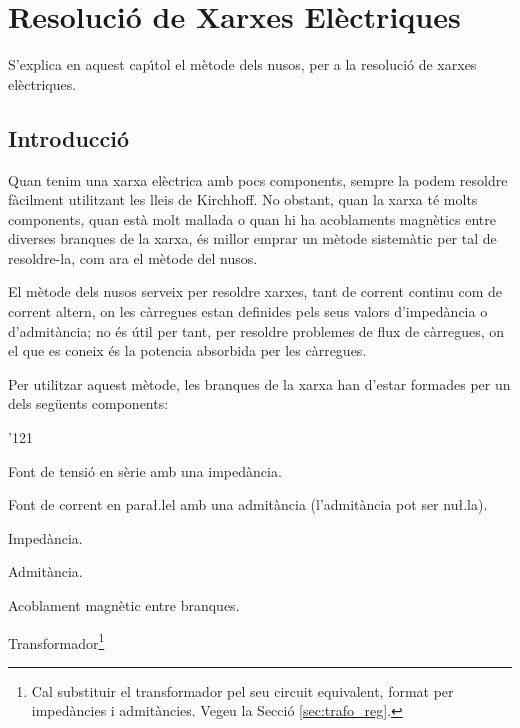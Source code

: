 \chapter{Resoluci\'{o} de Xarxes El\`{e}ctriques} \label{chap:nusos}

S'explica en aquest cap\'{\i}tol el
m\`{e}tode dels nusos, per a la resoluci\'{o} de xarxes el\`{e}ctriques.

\section{Introducci\'{o}}

Quan tenim una xarxa el\`{e}ctrica amb pocs components, sempre la podem resoldre f\`{a}cilment
utilitzant les lleis de Kirchhoff. No obstant, quan la xarxa t\'{e} molts components, quan est\`{a}
 molt mallada o quan hi ha acoblaments magn\`{e}tics entre diverses branques de la xarxa, \'{e}s millor
 emprar un m\`{e}tode sistem\`{a}tic per tal de resoldre-la, com ara el m\`{e}tode del nusos.

El m\`{e}tode dels nusos serveix per resoldre xarxes, tant de corrent
continu com de corrent altern, on les c\`{a}rregues estan definides pels
seus valors d'imped\`{a}ncia o d'admit\`{a}ncia; no \'{e}s \'{u}til per tant, per
resoldre problemes de flux de c\`{a}rregues, on el que es coneix \'{e}s la
potencia absorbida per les c\`{a}rregues.

Per utilitzar aquest m\`{e}tode, les branques de la xarxa han d'estar
formades per un dels seg\"{u}ents components: \vspace{-1.5mm}
\begin{dinglist}{'121}
   \item Font de tensi\'{o} en s\`{e}rie amb una imped\`{a}ncia.
   \item Font de corrent en para{\l.l}el amb una admit\`{a}ncia (l'admit\`{a}ncia pot ser nu{\l.l}a).
   \item Imped\`{a}ncia.
   \item Admit\`{a}ncia.
   \item Acoblament magn\`{e}tic entre branques.
   \item Transformador\footnote{Cal substituir el transformador pel seu circuit equivalent, format per imped\`{a}ncies i
   admit\`{a}ncies. Vegeu la Secci\'{o} \ref{sec:trafo_reg}.}
\end{dinglist}
\vspace{-1.5mm}

